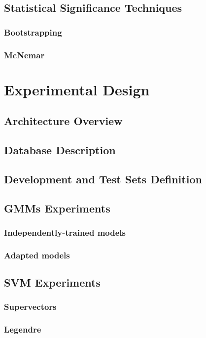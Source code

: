 \documentclass[11pt,a4paper]{tesis}
\begin{document}
	\section{Statistical Significance Techniques}
		\subsection{Bootstrapping}
		\subsection{McNemar}

\chapter{Experimental Design}
	\section{Architecture Overview}
		
	\section{Database Description}
	\section{Development and Test Sets Definition}
	\section{GMMs Experiments}
		\subsection{Independently-trained models}
		\subsection{Adapted models}
	\section{SVM Experiments}
		\subsection{Supervectors}
		\subsection{Legendre}
			
\end{document}
